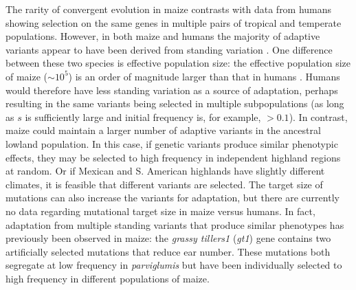 {{
The rarity of convergent evolution in maize contrasts with data from humans \citep{Tennessen_2011_21698142} showing selection on the same genes in multiple pairs of tropical and temperate populations.  
However, in both maize and humans the majority of adaptive variants appear to have been derived from standing variation \cite[]{Tennessen_2011_21698142}.
One difference between these two species is effective population size: the effective population size of maize ($\sim10^5$) is an order of magnitude larger than that in humans \cite[]{Takahata_1997_9114074}.
Humans would therefore have less standing variation as a source of adaptation, perhaps resulting in the same variants being selected in multiple subpopulations (as long as $s$ is sufficiently large and initial frequency is, for example, $>0.1$).
In contrast, maize could maintain a larger number of adaptive variants in the ancestral lowland population.
In this case, if genetic variants produce similar phenotypic effects, they may be selected to high frequency in independent highland regions at random.
Or if Mexican and S. American highlands have slightly different climates, it is feasible that different variants are selected.
The target size of mutations can also increase the variants for adaptation, but there are currently no data regarding mutational target size in maize versus humans.
 
In fact, adaptation from multiple standing variants that produce similar phenotypes has previously been observed in maize: the \emph{grassy tillers1} (\emph{gt1}) gene \cite[]{Wills_2013_23825971} contains two artificially selected mutations that reduce ear number.
These mutations both segregate at low frequency in \emph{parviglumis} but have been individually selected to high frequency in different populations of maize.


}}
